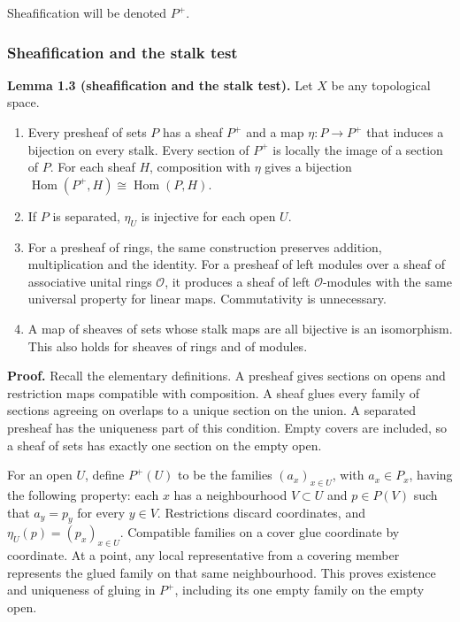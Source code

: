 \documentclass[
  english,
  11pt,
  a4paper,
]{article}
\providecommand{\tightlist}{%
  \setlength{\itemsep}{0pt}\setlength{\parskip}{0pt}}
\begin{document}
Sheafification will be denoted \(P^+\).

\subsubsection{Sheafification and the stalk
test}\label{sheaves-of-modules-on-a-ringed-space--sheafification-and-the-stalk-test}

\textbf{Lemma 1.3 (sheafification and the stalk test).} Let \(X\) be any
topological space.

\begin{enumerate}
\tightlist
\item
  Every presheaf of sets \(P\) has a sheaf \(P^+\) and a map
  \(\eta:P\to P^+\) that induces a bijection on every stalk. Every
  section of \(P^+\) is locally the image of a section of \(P\). For
  each sheaf \(H\), composition with \(\eta\) gives a bijection
  \(\operatorname{Hom}(P^+,H)\cong\operatorname{Hom}(P,H)\).
\item
  If \(P\) is separated, \(\eta_U\) is injective for each open \(U\).
\item
  For a presheaf of rings, the same construction preserves addition,
  multiplication and the identity. For a presheaf of left modules over a
  sheaf of associative unital rings \(\mathcal O\), it produces a sheaf
  of left \(\mathcal O\)-modules with the same universal property for
  linear maps. Commutativity is unnecessary.
\item
  A map of sheaves of sets whose stalk maps are all bijective is an
  isomorphism. This also holds for sheaves of rings and of modules.
\end{enumerate}

\textbf{Proof.} Recall the elementary definitions. A presheaf gives
sections on opens and restriction maps compatible with composition. A
sheaf glues every family of sections agreeing on overlaps to a unique
section on the union. A separated presheaf has the uniqueness part of
this condition. Empty covers are included, so a sheaf of sets has
exactly one section on the empty open.

For an open \(U\), define \(P^+(U)\) to be the families
\((a_x)_{x\in U}\), with \(a_x\in P_x\), having the following property:
each \(x\) has a neighbourhood \(V\subset U\) and \(p\in P(V)\) such
that \(a_y=p_y\) for every \(y\in V\). Restrictions discard coordinates,
and \(\eta_U(p)=(p_x)_{x\in U}\). Compatible families on a cover glue
coordinate by coordinate. At a point, any local representative from a
covering member represents the glued family on that same neighbourhood.
This proves existence and uniqueness of gluing in \(P^+\), including its
one empty family on the empty open.
\end{document}

